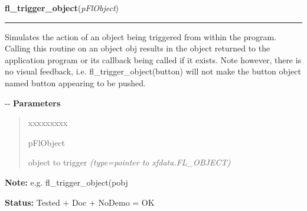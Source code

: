 \hspace{.8\funcindent}\begin{boxedminipage}{\funcwidth}

    \raggedright \textbf{fl\_trigger\_object}(\textit{pFlObject})

    \vspace{-1.5ex}

    \rule{\textwidth}{0.5\fboxrule}
\setlength{\parskip}{2ex}

Simulates the action of an object being triggered from within the
program. Calling this routine on an object obj results in the object
returned to the application program or its callback being called if it
exists. Note however, there is no visual feedback, i.e.
fl\_trigger\_object(button) will not make the button object named button
appearing to be pushed.

-{}-
\setlength{\parskip}{1ex}
      \textbf{Parameters}
      \vspace{-1ex}

      \begin{quote}
        \begin{Ventry}{xxxxxxxxx}

          \item[pFlObject]


object to trigger
            {\it (type=pointer to xfdata.FL\_OBJECT)}

        \end{Ventry}

      \end{quote}

\textbf{Note:} 
e.g. fl\_trigger\_object(pobj


\textbf{Status:} 
Tested + Doc + NoDemo = OK


    \end{boxedminipage}

    \label{xformslib:flbasic:fl_activate_object}

    \vspace{0.5ex}

